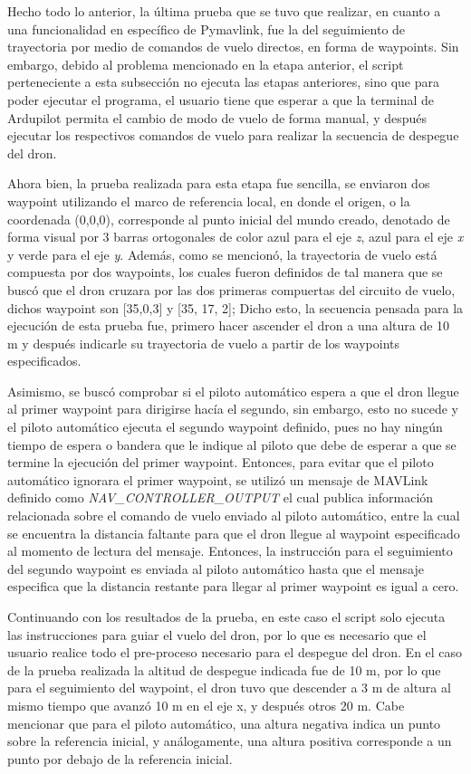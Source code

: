 Hecho todo lo anterior, la última prueba que se tuvo que realizar, en cuanto a una funcionalidad en específico de Pymavlink, fue la del seguimiento de trayectoria por medio de comandos de vuelo directos, en forma de waypoints. Sin embargo, debido al problema mencionado en la etapa anterior, el script perteneciente a esta subsección no ejecuta las etapas anteriores, sino que para poder ejecutar el programa, el usuario tiene que esperar a que la terminal de Ardupilot permita el cambio de modo de vuelo de forma manual, y después ejecutar los respectivos comandos de vuelo para realizar la secuencia de despegue del dron.

Ahora bien, la prueba realizada para esta etapa fue sencilla, se enviaron dos waypoint utilizando el marco de referencia local, en donde el origen, o la coordenada (0,0,0), corresponde al punto inicial del mundo creado, denotado de forma visual por 3 barras ortogonales de color azul para el eje \textit{z}, azul para el eje \textit{x} y verde para el eje \textit{y}. Además, como se mencionó, la trayectoria de vuelo está compuesta por dos waypoints, los cuales fueron definidos de tal manera que se buscó que el dron cruzara por las dos primeras compuertas del circuito de vuelo, dichos waypoint son [35,0,3] y [35, 17, 2]; Dicho esto, la secuencia pensada para la ejecución de esta prueba fue, primero hacer ascender el dron a una altura de 10 m y después indicarle su trayectoria de vuelo a partir de los waypoints especificados. 

Asimismo, se buscó comprobar si el piloto automático espera a que el dron llegue al primer waypoint para dirigirse hacía el segundo, sin embargo, esto no sucede y el piloto automático ejecuta el segundo waypoint definido, pues no hay ningún tiempo de espera o bandera que le indique al piloto que debe de esperar a que se termine la ejecución del primer waypoint. Entonces, para evitar que el piloto automático ignorara el primer waypoint, se utilizó un mensaje de MAVLink definido como \textit{NAV\_CONTROLLER\_OUTPUT} el cual publica información relacionada sobre el comando de vuelo enviado al piloto automático, entre la cual se encuentra la distancia faltante para que el dron llegue al waypoint especificado al momento de lectura del mensaje. Entonces, la instrucción para el seguimiento del segundo waypoint es enviada al piloto automático hasta que el mensaje especifica que la distancia restante para llegar al primer waypoint es igual a cero.

Continuando con los resultados de la prueba, en este caso el script solo ejecuta las instrucciones para guiar el vuelo del dron, por lo que es necesario que el usuario realice todo el pre-proceso necesario para el despegue del dron. En el caso de la prueba realizada la altitud de despegue indicada fue de 10 m, por lo que para el seguimiento del waypoint, el dron tuvo que descender a 3 m de altura al mismo tiempo que avanzó 10 m en el eje x, y después otros 20 m. Cabe mencionar que para el piloto automático, una altura negativa indica un punto sobre la referencia inicial, y análogamente, una altura positiva corresponde a un punto por debajo de la referencia inicial. 

